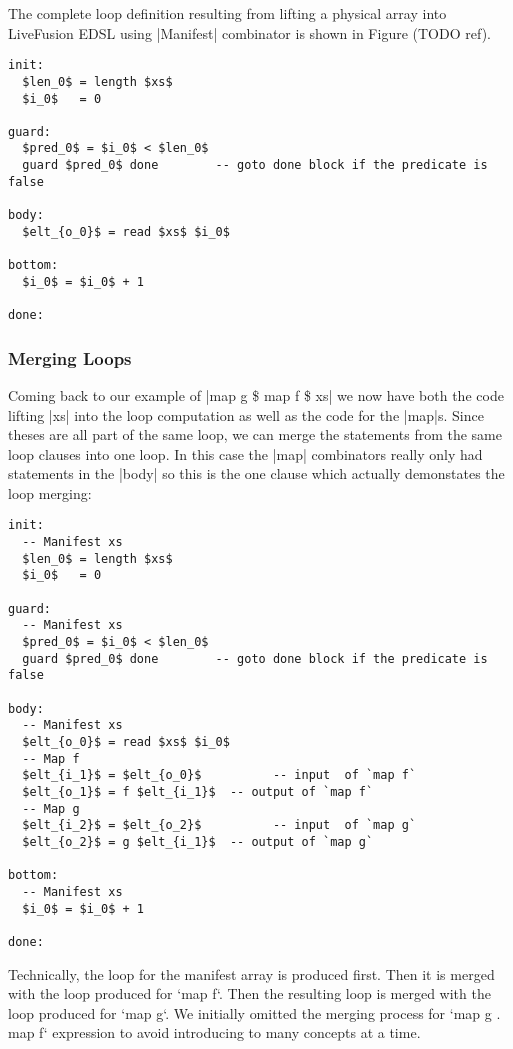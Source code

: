The complete loop definition resulting from lifting a physical array into LiveFusion EDSL using |Manifest| combinator is shown in Figure (TODO ref).

\begin{lstlisting}[mathescape]
init:
  $len_0$ = length $xs$
  $i_0$   = 0

guard:
  $pred_0$ = $i_0$ < $len_0$
  guard $pred_0$ done        -- goto done block if the predicate is false

body:
  $elt_{o_0}$ = read $xs$ $i_0$

bottom:
  $i_0$ = $i_0$ + 1

done:

\end{lstlisting}


\subsubsection{Merging Loops}

Coming back to our example of |map g \$ map f \$ xs| we now have both the code lifting |xs| into the loop computation as well as the code for the |map|s. Since theses are all part of the same loop, we can merge the statements from the same loop clauses into one loop. In this case the |map| combinators really only had statements in the |body| so this is the one clause which actually demonstates the loop merging:

\begin{lstlisting}[mathescape]
init:
  -- Manifest xs
  $len_0$ = length $xs$
  $i_0$   = 0

guard:
  -- Manifest xs
  $pred_0$ = $i_0$ < $len_0$
  guard $pred_0$ done        -- goto done block if the predicate is false

body:
  -- Manifest xs
  $elt_{o_0}$ = read $xs$ $i_0$
  -- Map f
  $elt_{i_1}$ = $elt_{o_0}$          -- input  of `map f`
  $elt_{o_1}$ = f $elt_{i_1}$  -- output of `map f`
  -- Map g
  $elt_{i_2}$ = $elt_{o_2}$          -- input  of `map g`
  $elt_{o_2}$ = g $elt_{i_1}$  -- output of `map g`

bottom:
  -- Manifest xs
  $i_0$ = $i_0$ + 1

done:

\end{lstlisting}


Technically, the loop for the manifest array is produced first. Then it is merged with the loop produced for `map f`. Then the resulting loop is merged with the loop produced for `map g`. We initially omitted the merging process for `map g . map f` expression to avoid introducing to many concepts at a time.


